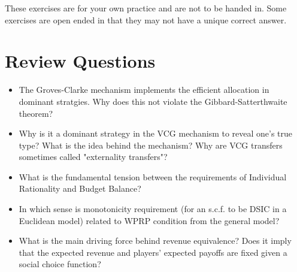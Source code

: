 \documentclass{article}
\newcommand{\enterProblemHeader}[1]{
\nobreak\extramarks{#1}{#1 continued on next page\ldots}\nobreak
\nobreak\extramarks{#1 (continued)}{#1 continued on next page\ldots}\nobreak
}
\newcommand{\exitProblemHeader}[1]{
\nobreak\extramarks{#1 (continued)}{#1 continued on next page\ldots}\nobreak
\nobreak\extramarks{#1}{}\nobreak
}
\newcounter{homeworkProblemCounter} %
\newcommand{\homeworkProblemName}{}
\newenvironment{ex}[1][Problem \arabic{homeworkProblemCounter}]{ %
\stepcounter{homeworkProblemCounter} %
\renewcommand{\homeworkProblemName}{#1} %
\section{\homeworkProblemName} %
}{
}
\newif\ifsolutions
\begin{document}
\ifsolutions
	\begin{center}

		{\Huge Problem Set for Lecture 2(b)
(with Solutions)}
	\end{center}

	\emph{The solutions below brought to you by Hannah Barth and Inga Reymann. Where necessary, I also present older solutions available to me (instead or in addition to those by Hannah and Inga). Notes in cursive added by Egor.}
\fi

	
These exercises are for your own practice and are not to be handed in. Some exercises are open ended in that they may not have a unique correct answer.


\begin{ex}[Review Questions]
	\begin{itemize}
		\item The Groves-Clarke mechanism implements the efficient allocation in dominant stratgies. Why does this not violate the Gibbard-Satterthwaite theorem?
		\item Why is it a dominant strategy in the VCG mechanism to reveal one’s true type? What is the idea behind the mechanism? Why are VCG transfers sometimes called "externality transfers"?
		\item What is the fundamental tension between the requirements of Individual Rationality and Budget Balance?
		\item In which sense is monotonicity requirement (for an s.c.f. to be DSIC in a Euclidean model) related to WPRP condition from the general model?
		\item What is the main driving force behind revenue equivalence? Does it imply that the expected revenue and players' expected payoffs are fixed given a social choice function?
	\end{itemize}
\end{ex}



\end{document}
